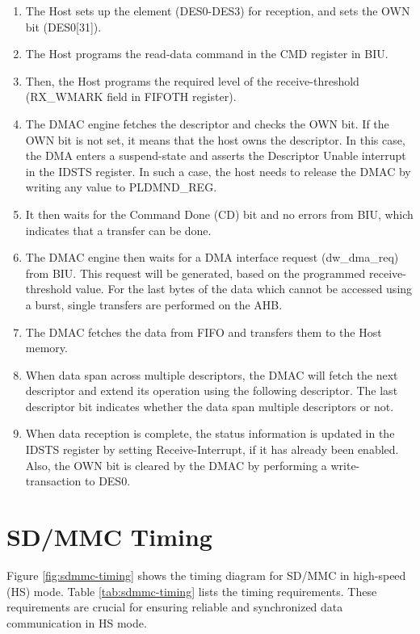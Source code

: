 \documentclass[main\_\_EN.tex]{subfiles}
\begin{document}
\begin{enumerate}
\item The Host sets up the element (DES0-DES3) for reception, and sets the OWN bit (DES0[31]).
\item The Host programs the read-data command in the CMD register in BIU.
\item Then, the Host programs the required level of the receive-threshold (RX\_WMARK field in FIFOTH register).
\item The DMAC engine fetches the descriptor and checks the OWN bit. If the OWN bit is not set, it means that the host owns the descriptor. In this case, the DMA enters a suspend-state and asserts the Descriptor Unable interrupt in the IDSTS register. In such a case, the host needs to release the DMAC by writing any value to PLDMND\_REG.
\item It then waits for the Command Done (CD) bit and no errors from BIU, which indicates that a transfer can be done.
\item The DMAC engine then waits for a DMA interface request (dw\_dma\_req) from BIU. This request will be generated, based on the programmed receive-threshold value. For the last bytes of the data which cannot be accessed using a burst, single transfers are performed on the AHB.
\item The DMAC fetches the data from FIFO and transfers them to the Host memory.
\item When data span across multiple descriptors, the DMAC will fetch the next descriptor and extend its operation using the following descriptor. The last descriptor bit indicates whether the data span multiple descriptors or not.
\item When data reception is complete, the status information is updated in the IDSTS register by setting Receive-Interrupt, if it has already been enabled. Also, the OWN bit is cleared by the DMAC by performing a write-transaction to DES0.
\end{enumerate}

\section{SD/MMC Timing}

Figure \ref{fig:sdmmc-timing} shows the timing diagram for SD/MMC in high-speed (HS) mode. Table \ref{tab:sdmmc-timing} lists the timing requirements. These requirements are crucial for ensuring reliable and synchronized data communication in HS mode.
\end{document}
